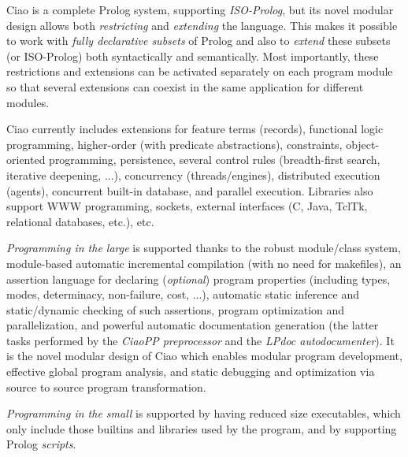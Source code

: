 \documentclass{article}
\newcommand{\ciao}{\psfig{figure=ciao_s.ps,width=2.5cm}}
\begin{document}
\pagestyle{empty}

\twocolumn[
\noindent
\hbox{
\begin{Huge}
{\bf The 
\begin{minipage}[c]{0.3\textwidth}
\ciao
\end{minipage}
1.8 Prolog System}\\
\end{Huge}
}
\centerline{Ciao is \emph{free software} distributed under GNU
  licenses}  
\vspace{0.5\baselineskip}
]

Ciao is a complete Prolog system, supporting \emph{ISO-Prolog}, but
its novel modular design allows both \emph{restricting} and
\emph{extending} the language. This makes it possible to work with
\emph{fully declarative subsets} of Prolog and also to \emph{extend}
these subsets (or ISO-Prolog) both syntactically and semantically.
Most importantly, these restrictions and extensions can be activated
separately on each program module so that several extensions can 
coexist in the same application for different modules.

Ciao currently includes extensions for feature terms (records),
functional logic programming, higher-order (with predicate
abstractions), constraints, object-oriented programming, persistence,
several control rules (breadth-first search, iterative deepening,
...), concurrency (threads/engines), distributed execution (agents),
concurrent built-in database, and parallel execution.  Libraries also
support WWW programming, sockets, external interfaces (C, Java, TclTk,
relational databases, etc.), etc.

\emph{Programming in the large} is supported thanks to the robust
module/class system, module-based automatic incremental compilation
(with no need for makefiles), an assertion language for declaring
(\emph{optional}) program properties (including types, modes,
determinacy, non-failure, cost, ...), automatic static inference and
static/dynamic checking of such assertions, program optimization and
parallelization, and powerful automatic documentation generation (the
latter tasks performed by the \emph{CiaoPP preprocessor} and the
\emph{LPdoc autodocumenter}).  It is the novel modular design of Ciao
which enables modular program development, effective global program
analysis, and static debugging and optimization via source to source
program transformation.

\emph{Programming in the small} is supported by having reduced size
executables, which only include those builtins and libraries used by
the program, and by supporting
Prolog \emph{scripts}.
\end{document}
